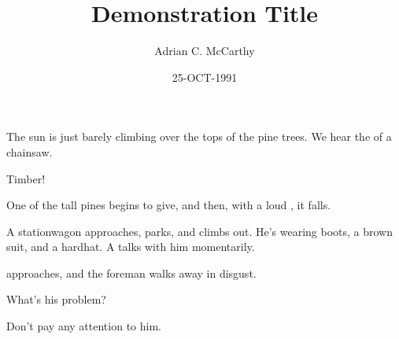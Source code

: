 




\TV %
\proof %

\series{}  %
\title{Demonstration Title} %
\author{Adrian C. McCarthy} %
\date{25-OCT-1991}  %
\showcopyright{\number\year}
\address{1234 Main Street \\
         Anytown, MO 54321 \\
         (323) 555-1234}

\maketitle %


\teaser %



\stage The sun is just barely climbing over the tops of the pine trees.
We hear the  of a chainsaw.

Timber!

\stage One of the tall pines begins to give, and then, with a loud
, it falls.



\stage A stationwagon approaches, parks, and  climbs out. 
He's wearing boots, a brown suit, and a hardhat.  A  talks with
him momentarily.

 approaches, and the foreman walks away in disgust.

  What's his problem?

 Don't pay any attention to him.

